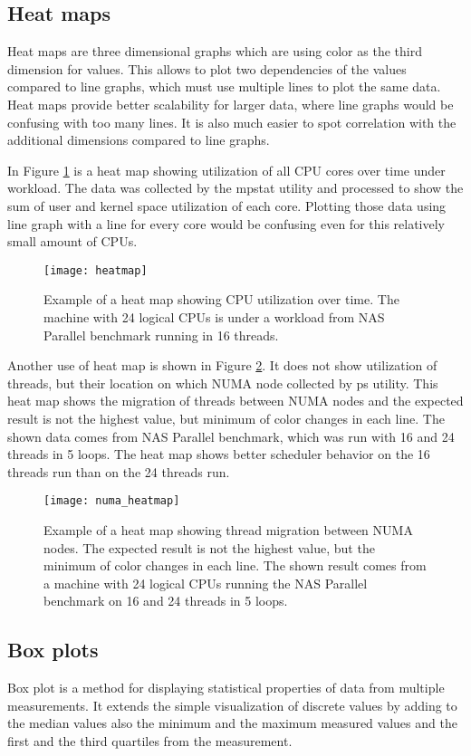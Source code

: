 \subsection{Heat maps}
Heat maps are three dimensional graphs which are using color as the third
dimension for values. This allows to plot two dependencies of the values
compared to line graphs, which must use multiple lines to plot the same data.
Heat maps provide better scalability for larger data, where line graphs would be
confusing with too many lines. It is also much easier to spot correlation
with the additional dimensions compared to line graphs.

In Figure \ref{fig:heatmap} is a heat map showing utilization of all CPU cores over
time under workload. The data was collected by the mpstat utility and processed to
show the sum of user and kernel space utilization of each core. Plotting those data
using line graph with a line for every core would be confusing even for this
relatively small amount of CPUs.

\begin{figure}
  \centering
  \texttt{[image: heatmap]}
  \caption{Example of a heat map showing CPU utilization over time. The machine
    with 24 logical CPUs is under a workload from NAS Parallel benchmark running
    in 16 threads.}
  \label{fig:heatmap}
\end{figure}

Another use of heat map is shown in Figure \ref{fig:numa_heatmap}. It does not
show utilization of threads, but their location on which NUMA node collected by
ps utility. This heat map shows the migration of threads between NUMA nodes and
the expected result is not the highest value, but minimum of color changes in
each line. The shown data comes from NAS Parallel benchmark, which was run with
16 and 24 threads in 5 loops. The heat map shows better scheduler behavior on
the 16 threads run than on the 24 threads run.

\begin{figure}
  \centering
  \texttt{[image: numa\_heatmap]}
  \caption{Example of a heat map showing thread migration between NUMA nodes. The
    expected result is not the highest value, but the minimum of color changes in
    each line. The shown result comes from a machine with 24 logical CPUs running
    the NAS Parallel benchmark on 16 and 24 threads in 5 loops.}
  \label{fig:numa_heatmap}
\end{figure}

\subsection{Box plots}
Box plot is a method for displaying statistical properties of data from multiple
measurements. It extends the simple visualization of discrete values by adding
to the median values also the minimum and the maximum measured values and the
first and the third quartiles from the measurement.

